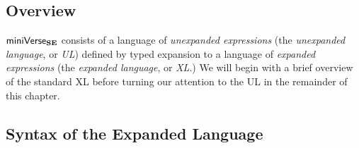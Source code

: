 \subsection{Overview}

$\mathsf{miniVerse}_\textbf{SE}$ consists of a language of \emph{unexpanded expressions} (the \emph{unexpanded language}, or \emph{UL}) defined by typed expansion to a  language of \emph{expanded expressions} (the \emph{expanded language}, or \emph{XL}.) We will begin with a brief overview of the standard XL before turning our attention to the UL in the remainder of this chapter.

\subsection{Syntax of the Expanded Language}\label{sec:U-expanded-terms}

